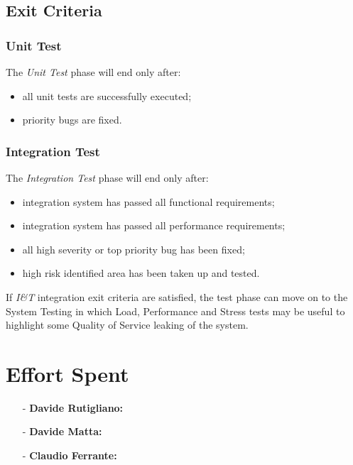 \documentclass[a4paper]{article}
\begin{document}
\subsection{Exit Criteria}
\subsubsection{Unit Test}
The \textit{Unit Test} phase will end only after:\\
\begin{itemize}
    \item all unit tests are successfully executed;
    \item priority bugs are fixed.
\end{itemize}

\subsubsection{Integration Test}
The \textit{Integration Test} phase will end only after:\\
\begin{itemize}
    \item integration system has passed all functional requirements;
    \item integration system has passed all performance requirements;
    \item all high severity or top priority bug has been fixed;
    \item high risk identified area has been taken up and tested. \newline
\end{itemize}

If \textit{I\&T} integration exit criteria are satisfied, the test phase can move on to the System Testing in which Load, Performance and Stress tests may be useful to highlight some Quality of Service leaking of the system.

\newpage
\section{Effort Spent}
    \begin{itemize}
        \item[-] \textbf{Davide Rutigliano: }
        
        \item[-] \textbf{Davide Matta: }
        
        \item[-] \textbf{Claudio Ferrante: }
    \end{itemize}
\end{document}
